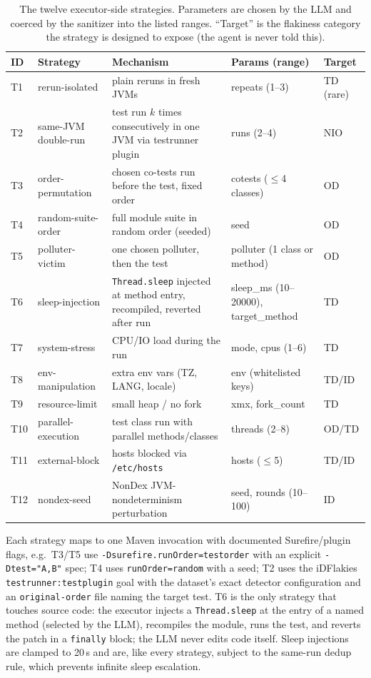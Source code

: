\begin{table}[t]
\caption{The twelve executor-side strategies. Parameters are chosen by the
LLM and coerced by the sanitizer into the listed ranges. ``Target'' is the
flakiness category the strategy is designed to expose (the agent is never
told this).}
\label{tab:strategies}
\small
\begin{tabular}{@{}llp{4.1cm}ll@{}}
\toprule
\textbf{ID} & \textbf{Strategy} & \textbf{Mechanism} & \textbf{Params (range)} & \textbf{Target}\\
\midrule
T1 & rerun-isolated & plain reruns in fresh JVMs & repeats (1--3) & TD (rare)\\
T2 & same-JVM double-run & test run $k$ times consecutively in one JVM via testrunner plugin & runs (2--4) & NIO\\
T3 & order-permutation & chosen co-tests run before the test, fixed order & cotests ($\le$4 classes) & OD\\
T4 & random-suite-order & full module suite in random order (seeded) & seed & OD\\
T5 & polluter-victim & one chosen polluter, then the test & polluter (1 class or method) & OD\\
T6 & sleep-injection & \texttt{Thread.sleep} injected at method entry, recompiled, reverted after run & sleep\_ms (10--20000), target\_method & TD\\
T7 & system-stress & CPU/IO load during the run & mode, cpus (1--6) & TD\\
T8 & env-manipulation & extra env vars (TZ, LANG, locale) & env (whitelisted keys) & TD/ID\\
T9 & resource-limit & small heap / no fork & xmx, fork\_count & TD\\
T10 & parallel-execution & test class run with parallel methods/classes & threads (2--8) & OD/TD\\
T11 & external-block & hosts blocked via \texttt{/etc/hosts} & hosts ($\le$5) & TD/ID\\
T12 & nondex-seed & NonDex JVM-nondeterminism perturbation & seed, rounds (10--100) & ID\\
\bottomrule
\end{tabular}
\end{table}

Each strategy maps to one Maven invocation with documented Surefire/plugin
flags, e.g.~T3/T5 use \texttt{-Dsurefire.runOrder=testorder} with an explicit
\texttt{-Dtest="A,B"} spec; T4 uses \texttt{runOrder=random} with a seed; T2
uses the iDFlakies \texttt{testrunner:testplugin} goal with the dataset's
exact detector configuration and an \texttt{original-order} file naming the
target test. T6 is the only strategy that touches source code: the executor
injects a \texttt{Thread.sleep} at the entry of a named method
(selected by the LLM), recompiles the module, runs the test, and reverts the
patch in a \texttt{finally} block; the LLM never edits code itself. Sleep
injections are clamped to 20\,s and are, like every strategy, subject to the
same-run dedup rule, which prevents infinite sleep escalation.

